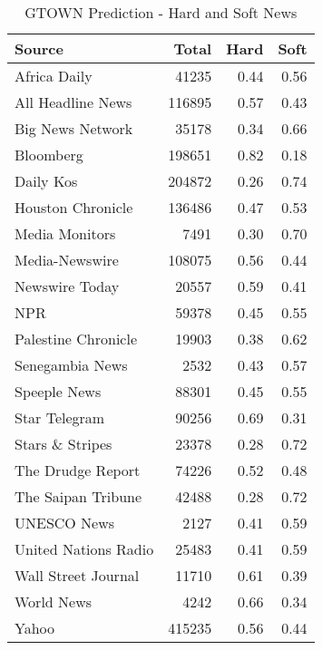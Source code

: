 \begin{table}[ht]
\centering
\caption{GTOWN Prediction - Hard and Soft News} 
\label{tab:gtown_pred_hard_soft}
\begin{tabular}{lrrr}
  \hline
Source & Total & Hard & Soft \\ 
  \hline
Africa Daily & 41235 & 0.44 & 0.56 \\ 
  All Headline News & 116895 & 0.57 & 0.43 \\ 
  Big News Network & 35178 & 0.34 & 0.66 \\ 
  Bloomberg & 198651 & 0.82 & 0.18 \\ 
  Daily Kos & 204872 & 0.26 & 0.74 \\ 
  Houston Chronicle & 136486 & 0.47 & 0.53 \\ 
  Media Monitors & 7491 & 0.30 & 0.70 \\ 
  Media-Newswire & 108075 & 0.56 & 0.44 \\ 
  Newswire Today & 20557 & 0.59 & 0.41 \\ 
  NPR & 59378 & 0.45 & 0.55 \\ 
  Palestine Chronicle & 19903 & 0.38 & 0.62 \\ 
  Senegambia News & 2532 & 0.43 & 0.57 \\ 
  Speeple News & 88301 & 0.45 & 0.55 \\ 
  Star Telegram & 90256 & 0.69 & 0.31 \\ 
  Stars \& Stripes & 23378 & 0.28 & 0.72 \\ 
  The Drudge Report & 74226 & 0.52 & 0.48 \\ 
  The Saipan Tribune & 42488 & 0.28 & 0.72 \\ 
  UNESCO News & 2127 & 0.41 & 0.59 \\ 
  United Nations Radio & 25483 & 0.41 & 0.59 \\ 
  Wall Street Journal & 11710 & 0.61 & 0.39 \\ 
  World News & 4242 & 0.66 & 0.34 \\ 
  Yahoo & 415235 & 0.56 & 0.44 \\ 
   \hline
\end{tabular}
\end{table}
